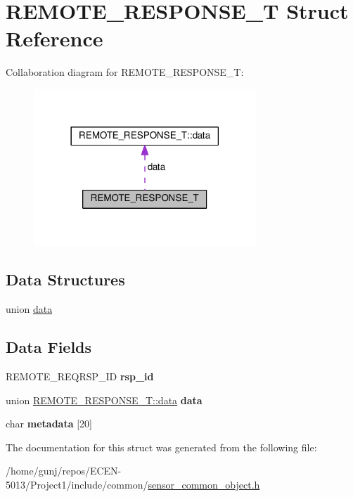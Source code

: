 \hypertarget{structREMOTE__RESPONSE__T}{}\section{R\+E\+M\+O\+T\+E\+\_\+\+R\+E\+S\+P\+O\+N\+S\+E\+\_\+T Struct Reference}
\label{structREMOTE__RESPONSE__T}


Collaboration diagram for R\+E\+M\+O\+T\+E\+\_\+\+R\+E\+S\+P\+O\+N\+S\+E\+\_\+T\+:
\nopagebreak
\begin{figure}[H]
\begin{center}
\leavevmode
\includegraphics[width=237pt]{structREMOTE__RESPONSE__T__coll__graph}
\end{center}
\end{figure}
\subsection*{Data Structures}
\begin{DoxyCompactItemize}
\item 
union \hyperlink{unionREMOTE__RESPONSE__T_1_1data}{data}
\end{DoxyCompactItemize}
\subsection*{Data Fields}
\begin{DoxyCompactItemize}
\item 
R\+E\+M\+O\+T\+E\+\_\+\+R\+E\+Q\+R\+S\+P\+\_\+\+ID {\bfseries rsp\+\_\+id}\hypertarget{structREMOTE__RESPONSE__T_aeffb937926ea1d5ae378d59eec691357}{}\label{structREMOTE__RESPONSE__T_aeffb937926ea1d5ae378d59eec691357}

\item 
union \hyperlink{unionREMOTE__RESPONSE__T_1_1data}{R\+E\+M\+O\+T\+E\+\_\+\+R\+E\+S\+P\+O\+N\+S\+E\+\_\+\+T\+::data} {\bfseries data}\hypertarget{structREMOTE__RESPONSE__T_a7cf162cedf8f984c2f287815632fdfd0}{}\label{structREMOTE__RESPONSE__T_a7cf162cedf8f984c2f287815632fdfd0}

\item 
char {\bfseries metadata} \mbox{[}20\mbox{]}\hypertarget{structREMOTE__RESPONSE__T_a3382443efefd8a97a65e01578dfa9246}{}\label{structREMOTE__RESPONSE__T_a3382443efefd8a97a65e01578dfa9246}

\end{DoxyCompactItemize}


The documentation for this struct was generated from the following file\+:\begin{DoxyCompactItemize}
\item 
/home/gunj/repos/\+E\+C\+E\+N-\/5013/\+Project1/include/common/\hyperlink{sensor__common__object_8h}{sensor\+\_\+common\+\_\+object.\+h}\end{DoxyCompactItemize}
